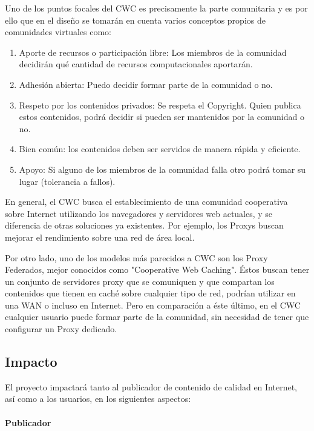 Uno de los puntos focales del CWC es precisamente la parte comunitaria y es por ello que en el diseño se tomarán en cuenta varios conceptos propios de comunidades virtuales como: 

\begin{enumerate}
\item Aporte de recursos o participación libre: Los miembros de la comunidad decidirán qué cantidad de recursos computacionales aportarán.
\item Adhesión abierta: Puedo decidir formar parte de la comunidad o no.
\item Respeto por los contenidos privados: Se respeta el Copyright. Quien publica estos contenidos, podrá decidir si pueden ser mantenidos por la comunidad o no.
\item Bien común: los contenidos deben ser servidos de manera rápida y eficiente.
\item Apoyo: Si alguno de los miembros de la comunidad falla otro podrá tomar su lugar (tolerancia a fallos).
\end{enumerate}

En general, el CWC busca el establecimiento de una comunidad cooperativa sobre Internet utilizando los navegadores y servidores web actuales, y se diferencia de otras soluciones ya existentes. Por ejemplo, los Proxys buscan mejorar el rendimiento sobre una red de área local. 

Por otro lado, uno de los modelos más parecidos a CWC son los Proxy Federados, mejor conocidos como "Cooperative Web Caching". Éstos buscan tener un conjunto de servidores proxy que se comuniquen y que compartan los contenidos que tienen en caché sobre cualquier tipo de red, podrían utilizar en una WAN o incluso en Internet. Pero en comparación a éste último, en el CWC cualquier usuario puede formar parte de la comunidad, sin necesidad de tener que configurar un Proxy dedicado.


\subsection{Impacto}


El proyecto impactará tanto al publicador de contenido de calidad en Internet, así como a los usuarios, en los siguientes aspectos:

\paragraph{Publicador}


